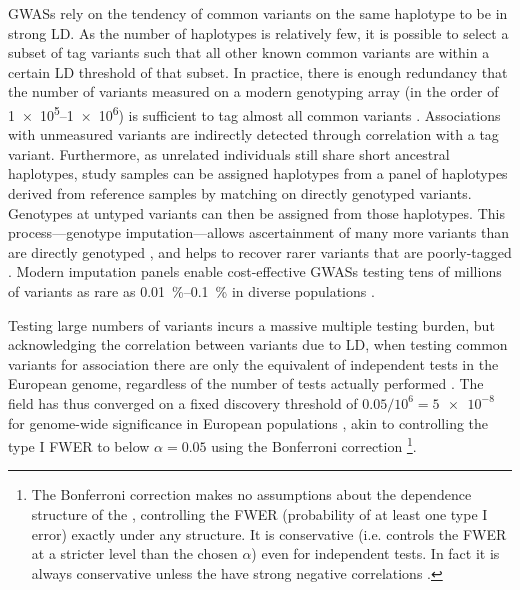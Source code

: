 \begin{outline}
\glspl{GWAS} rely on the tendency of common variants on the same haplotype to be in strong \gls{LD}.
As the number of haplotypes is relatively few, 
it is possible to select a subset of tag variants such that all other known common variants are within a certain \gls{LD} threshold of that subset. 
In practice, there is enough redundancy that the number of variants measured on a modern genotyping array (in the order of \numrange[retain-unity-mantissa=false]{1e5}{1e6}) is sufficient to tag almost all common variants  \autocite{theinternationalhapmapconsortium2005HaplotypeMapHuman,barrett2006EvaluatingCoverageGenomewide}.
Associations with unmeasured variants are indirectly detected through correlation with a tag variant.
Furthermore, as unrelated individuals still share short ancestral haplotypes, 
study samples can be assigned haplotypes from a panel of haplotypes derived from reference samples by matching on directly genotyped variants. 
Genotypes at untyped variants can then be assigned from those haplotypes.
This process---genotype imputation---allows ascertainment of many more variants than are directly genotyped \autocite{das2018GenotypeImputationLarge},
and helps to recover rarer variants that are poorly-tagged \autocite{visscher201710YearsGWAS}.
Modern imputation panels enable cost-effective \glspl{GWAS} testing tens of millions of variants as rare as \SIrange[parse-numbers=false]{0.01}{0.1}{\percent} in diverse populations \autocite{taliun2019Sequencing53831}.

Testing large numbers of variants incurs a massive multiple testing burden, but acknowledging the correlation between variants due to \gls{LD},
when testing common variants for association there are only the equivalent of  independent tests in the European genome, regardless of the number of tests actually performed \autocite{peer2008EstimationMultipleTesting}.
The field has thus converged on a fixed discovery threshold of $0.05 / 10^6 = \num{5e-8}$ for genome-wide significance in European populations \autocite{jannot2015108HasEmerged}, akin to controlling the type I \gls{FWER} to below $\alpha = 0.05$ using the Bonferroni correction%
\footnote{
    The Bonferroni correction makes no assumptions about the dependence structure of the \pvalues{}, controlling the \gls{FWER} (probability of at least one type I error) exactly under any structure.
    It is conservative (i.e. controls the \gls{FWER} at a stricter level than the chosen $\alpha$) even for independent tests. 
    In fact it is always conservative unless the \pvalues{} have strong negative correlations \autocite{goeman2014MultipleHypothesisTesting}.
}.


\end{outline}
